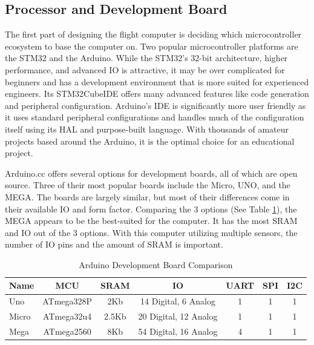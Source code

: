 \documentclass[conf]{new-aiaa}
\begin{document}
\subsection{Processor and Development Board}
\label{subsec:dev}

The first part of designing the flight computer is deciding which microcontroller ecosystem to base the computer on. Two popular microcontroller platforms are the STM32 and the Arduino. While the STM32's 32-bit architecture, higher performance, and advanced IO is attractive\cite{whystm}, it may be over complicated for beginners and has a development environment that is more suited for experienced engineers. Its STM32CubeIDE offers many advanced features like code generation and peripheral configuration\cite{stmcube}. Arduino's IDE is significantly more user friendly as it uses standard peripheral configurations and handles much of the configuration itself using its HAL and purpose-built language\cite{arduinoide,arduinolang}. With thousands of amateur projects based around the Arduino, it is the optimal choice for an educational project\cite{whyarduino}.

Arduino.cc offers several options for development boards, all of which are open source. Three of their most popular boards include the Micro\cite{microdescription}, UNO\cite{unodescription}, and the MEGA\cite{megadescription}. The boards are largely similar, but most of their differences come in their available IO and form factor. Comparing the 3 options (See Table \ref{tab:arduino}), the MEGA appears to be the best-suited for the computer. It has the most SRAM and IO out of the 3 options. With this computer utilizing multiple sensors, the number of IO pins and the amount of SRAM is important. 

 \begin{table}[H]
 \caption{\label{tab:arduino} Arduino Development Board Comparison}
 \centering
 \begin{tabular}{lcccccc}
 
 \hline Name\footnotemark[1] & MCU & SRAM & IO & UART & SPI & I2C\\ \hline

 Uno\cite{unodescription} & ATmega328P\cite{atmega328p} & 2Kb & 14 Digital, 6 Analog & 1 & 1 & 1\\
 Micro\cite{microdescription} & ATmega32u4\cite{atmega32u4} & 2.5Kb & 20 Digital, 12 Analog & 1 & 1 & 1\\
 Mega\cite{megadescription} & ATmega2560\cite{atmega2560} & 8Kb & 54 Digital, 16 Analog & 4 & 1 & 1\\
 
 \hline
 \end{tabular}
 \end{table}
\end{document}
